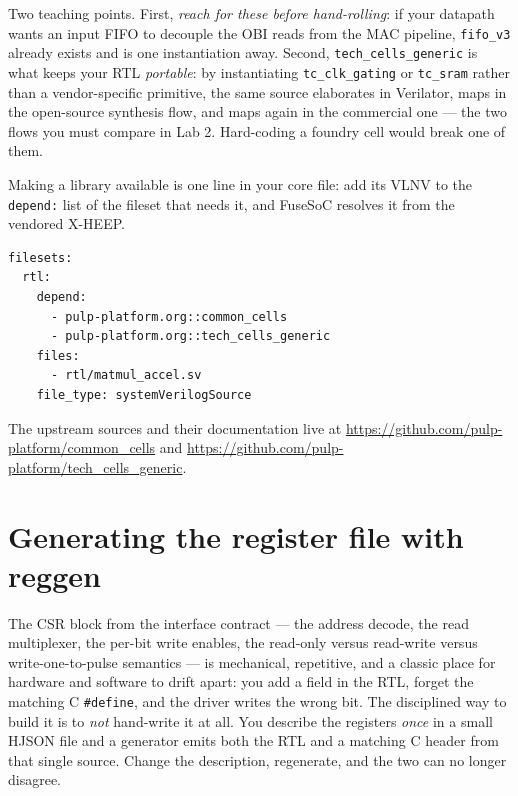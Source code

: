 \documentclass[11pt]{article}
\newcommand{\code}[1]{\texttt{#1}}
\begin{document}
Two teaching points. First, \emph{reach for these before hand-rolling}: if your
datapath wants an input FIFO to decouple the OBI reads from the MAC pipeline,
\code{fifo\_v3} already exists and is one instantiation away. Second,
\code{tech\_cells\_generic} is what keeps your RTL \emph{portable}: by
instantiating \code{tc\_clk\_gating} or \code{tc\_sram} rather than a
vendor-specific primitive, the same source elaborates in Verilator, maps in the
open-source synthesis flow, and maps again in the commercial one --- the two
flows you must compare in Lab 2. Hard-coding a foundry cell would break one of
them.

Making a library available is one line in your core file: add its VLNV to the
\code{depend:} list of the fileset that needs it, and FuseSoC resolves it from
the vendored X-HEEP.

\begin{lstlisting}[style=sh]
filesets:
  rtl:
    depend:
      - pulp-platform.org::common_cells
      - pulp-platform.org::tech_cells_generic
    files:
      - rtl/matmul_accel.sv
    file_type: systemVerilogSource
\end{lstlisting}

The upstream sources and their documentation live at
\url{https://github.com/pulp-platform/common_cells} and
\url{https://github.com/pulp-platform/tech_cells_generic}.

\section{Generating the register file with reggen}

The CSR block from the interface contract --- the address decode, the read
multiplexer, the per-bit write enables, the read-only versus read-write versus
write-one-to-pulse semantics --- is mechanical, repetitive, and a classic place
for hardware and software to drift apart: you add a field in the RTL, forget the
matching C \code{\#define}, and the driver writes the wrong bit. The disciplined
way to build it is to \emph{not} hand-write it at all. You describe the registers
\emph{once} in a small HJSON file and a generator emits both the RTL and a
matching C header from that single source. Change the description, regenerate,
and the two can no longer disagree.
\end{document}
